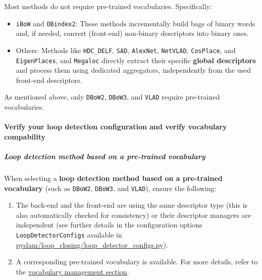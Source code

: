 \documentclass{article}
\let\oldparagraph\paragraph
\renewcommand{\paragraph}[1]{\oldparagraph{#1}\mbox{}}
\let\oldsubparagraph\subparagraph
\renewcommand{\subparagraph}[1]{\oldsubparagraph{#1}\mbox{}}
\begin{document}
Most methods do not require pre-trained vocabularies. Specifically:
\begin{itemize}
\item \texttt{iBoW} and \texttt{OBindex2}: These methods incrementally build
bags of binary words and, if needed, convert (front-end) non-binary
descriptors into binary ones. 
\item Others: Methods like \texttt{HDC\_DELF},
\texttt{SAD}, \texttt{AlexNet}, \texttt{NetVLAD}, \texttt{CosPlace}, and
\texttt{EigenPlaces}, and \texttt{Megaloc} directly extract their specific \textbf{global
descriptors} and process them using dedicated aggregators, independently
from the used front-end descriptors.
\end{itemize}

As mentioned above, only \texttt{DBoW2}, \texttt{DBoW3}, and
\texttt{VLAD} require pre-trained vocabularies.

\hypertarget{double-check-your-loop-detection-configuration-and-verify-vocabulary-compability}{%
\paragraph{Verify your loop detection configuration and verify
vocabulary
compability}\label{double-check-your-loop-detection-configuration-and-verify-vocabulary-compability}}

\hypertarget{loop-detection-method-based-on-a-pre-trained-vocabulary}{%
\subparagraph{Loop detection method based on a pre-trained
vocabulary}\label{loop-detection-method-based-on-a-pre-trained-vocabulary}}

When selecting a \textbf{loop detection method based on a pre-trained
vocabulary} (such as \texttt{DBoW2}, \texttt{DBoW3}, and \texttt{VLAD}),
ensure the following: 
\begin{enumerate}
\item The back-end and the front-end are using the
same descriptor type (this is also automatically checked for
consistency) or their descriptor managers are independent (see further
details in the configuration options \texttt{LoopDetectorConfigs}
available in \href{https://github.com/luigifreda/pyslam/blob/master/pyslam/loop_closing/loop_detector_configs.py}{pyslam/loop\_closing/loop\_detector\_configs.py}). 
\item A corresponding pre-trained vocubulary is available. For more details,
refer to the \protect\hyperlink{vocabulary-management}{vocabulary
management section}.
\end{enumerate}
\end{document}
